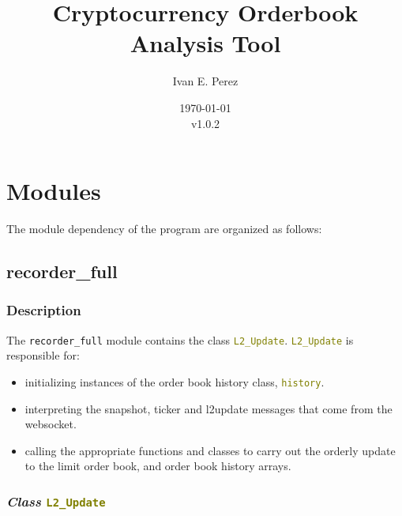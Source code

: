\documentclass[refman]{article}
\title{Cryptocurrency Orderbook Analysis Tool}
\author{Ivan E. Perez}
\date{\today\\v1.0.2}
\begin{document}
 
\maketitle
{} 
\tableofcontents 

 
\pagestyle{headings} 






\section{Modules}
	The module dependency of the program are organized as follows:


	\subsection{recorder\_full}
	
	\subsubsection{Description}
	
	The \texttt{recorder\_full} module contains the class \textcolor{olive}{\texttt{L2\_Update}}. \textcolor{olive}{\texttt{L2\_Update}} is responsible for:
	\begin{itemize}
		\item initializing instances of the order book history class, \textcolor{olive}{\texttt{history}}.
		\item interpreting the snapshot, ticker and l2update messages that come from the websocket.
		\item calling the appropriate functions and classes to carry out the orderly update to the limit order book, and order book history arrays.
	\end{itemize}

	\subsubsection{\textit{Class} \textcolor{olive}{\texttt{L2\_Update}} }
	
\end{document}
